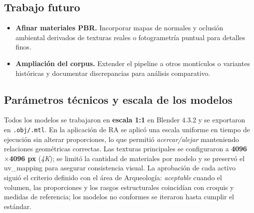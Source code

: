 \subsection{Trabajo futuro}

\begin{itemize}
    \item \textbf{Afinar materiales \gls{PBR}.} Incorporar mapas de normales y oclusión ambiental derivados de texturas reales o fotogrametría puntual para detalles finos.
    \item \textbf{Ampliación del corpus.} Extender el pipeline a otros montículos o variantes históricas y documentar discrepancias para análisis comparativo.
\end{itemize}





\subsection{Parámetros técnicos y escala de los modelos}
Todos los modelos se trabajaron en \textbf{escala 1:1} en Blender 4.3.2 y se exportaron en \texttt{.obj/.mtl}. En la aplicación de RA se aplicó una escala uniforme en tiempo de ejecución sin alterar proporciones, lo que permitió \emph{acercar/alejar} manteniendo relaciones geométricas correctas. Las texturas principales se configuraron a \textbf{4096$\times$4096 px} (\emph{4K}); se limitó la cantidad de materiales por modelo y se preservó el \gls{uv_mapping} para asegurar consistencia visual. La aprobación de cada activo siguió el criterio definido con el área de Arqueología: \emph{aceptable} cuando el volumen, las proporciones y los rasgos estructurales coincidían con croquis y medidas de referencia; los modelos no conformes se iteraron hasta cumplir el estándar.

